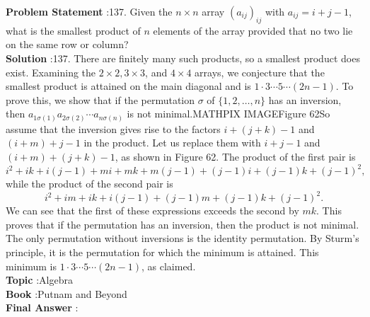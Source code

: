 \documentclass[10pt]{article}
\begin{document}
\textbf{Problem Statement} :137. Given the $n \times n$ array $\left(a_{i j}\right)_{i j}$ with $a_{i j}=i+j-1$, what is the smallest product of $n$ elements of the array provided that no two lie on the same row or column?\\
\textbf{Solution} :137. There are finitely many such products, so a smallest product does exist. Examining the $2 \times 2,3 \times 3$, and $4 \times 4$ arrays, we conjecture that the smallest product is attained on the main diagonal and is $1 \cdot 3 \cdots 5 \cdots(2 n-1)$. To prove this, we show that if the permutation $\sigma$ of $\{1,2, \ldots, n\}$ has an inversion, then $a_{1 \sigma(1)} a_{2 \sigma(2)} \cdots a_{n \sigma(n)}$ is not minimal.MATHPIX IMAGEFigure 62So assume that the inversion gives rise to the factors $i+(j+k)-1$ and $(i+m)+j-1$ in the product. Let us replace them with $i+j-1$ and $(i+m)+(j+k)-1$, as shown in Figure 62. The product of the first pair is$$ i^{2}+i k+i(j-1)+m i+m k+m(j-1)+(j-1) i+(j-1) k+(j-1)^{2}, $$while the product of the second pair is$$ i^{2}+i m+i k+i(j-1)+(j-1) m+(j-1) k+(j-1)^{2} . $$We can see that the first of these expressions exceeds the second by $m k$. This proves that if the permutation has an inversion, then the product is not minimal. The only permutation without inversions is the identity permutation. By Sturm's principle, it is the permutation for which the minimum is attained. This minimum is $1 \cdot 3 \cdots 5 \cdots(2 n-1)$, as claimed.\\
\textbf{Topic} :Algebra\\
\textbf{Book} :Putnam and Beyond\\
\textbf{Final Answer} :\\
\end{document}
